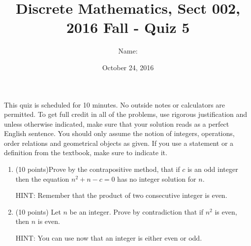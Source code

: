 \documentclass[11pt]{preprint}
\title{Discrete Mathematics, Sect 002, 2016 Fall - Quiz 5}
\date{October 24, 2016}
\author{Name:}
\institute{Courant Institute of Mathematical Sciences, NYU}
\begin{document}
\maketitle

This quiz is scheduled for 10 minutes. No outside notes or calculators are permitted. To get full credit  in all of the problems, use rigorous justification and unless otherwise indicated, make sure that your solution reads as a perfect English sentence. You should only assume the notion of integers, operations, order relations and geometrical objects as given. If you use a statement or a definition from the textbook, make sure to indicate it.
\vspace{0.2cm}

\begin{enumerate}
\item(10 points)Prove by the contrapositive method, that if $c$ is an odd integer then the equation $n^2+n-c=0$ has no integer solution for $n$.
\vspace{6cm}

HINT: Remember that the product of two consecutive integer is even.
\item (10 points) Let $n$ be an integer. Prove by contradiction that if $n^2$ is even, then $n$ is even.

HINT: You can use now that an integer is either even or odd.
\end{enumerate}
\end{document}
